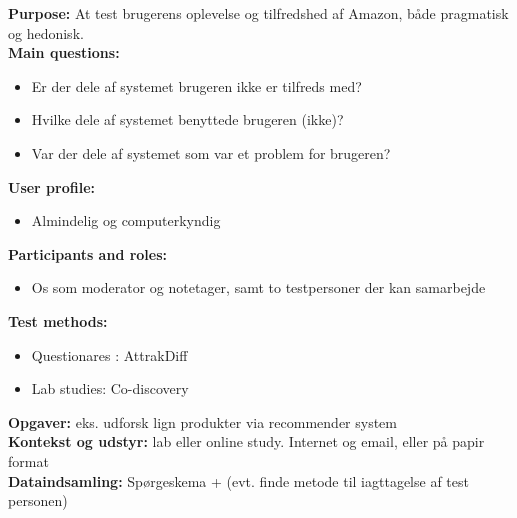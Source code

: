\textbf{Purpose:} At test brugerens oplevelse og tilfredshed af Amazon, både pragmatisk og hedonisk. \\
\textbf{Main questions:}
\begin{itemize}
\item Er der dele af systemet brugeren ikke er tilfreds med?
\item Hvilke dele af systemet benyttede brugeren (ikke)?
\item Var der dele af systemet som var et problem for brugeren?
\end{itemize}
\textbf{User profile:}
\begin{itemize}
\item Almindelig og computerkyndig
\end{itemize}
\textbf{Participants and roles:}
\begin{itemize}
\item Os som moderator og notetager, samt to testpersoner der kan samarbejde
\end{itemize}
\textbf{Test methods:}
\begin{itemize}
\item Questionares : AttrakDiff
\item Lab studies: Co-discovery
\end{itemize}
\textbf{Opgaver:} eks. udforsk lign produkter via recommender system \\
\textbf{Kontekst og udstyr:} lab eller online study. Internet og email, eller på papir format \\
\textbf{Dataindsamling:} Spørgeskema + (evt. finde metode til iagttagelse af test personen)